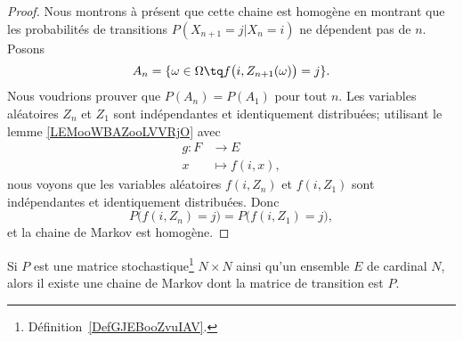 \begin{proof}
    Nous montrons à présent que cette chaine est homogène en montrant que les probabilités de transitions \( P(X_{n+1}=j|X_n=i)\) ne dépendent pas de \( n\). Posons
    \begin{equation}
        A_n=\{ \omega\in \Omega\tq f\big( i,Z_{n+1}(\omega) \big)=j \}.
    \end{equation}
    Nous voudrions prouver que \( P(A_n)=P(A_{1})\) pour tout \( n\). Les variables aléatoires \( Z_n\) et \( Z_1\) sont indépendantes et identiquement distribuées; utilisant le lemme \ref{LEMooWBAZooLVVRjO} avec 
    \begin{equation}
        \begin{aligned}
            g\colon F&\to E \\
            x&\mapsto f(i,x), 
        \end{aligned}
    \end{equation}
    nous voyons que les variables aléatoires \( f(i,Z_n)\) et \( f(i, Z_1)\) sont indépendantes et identiquement distribuées. Donc
    \begin{equation}
        P\big( f(i,Z_n)=j \big)=P\big( f(i,Z_1)=j \big),
    \end{equation}
    et la chaine de Markov est homogène.
\end{proof}

\begin{lemma}       \label{LEMooQBOIooMNbJlV}
    Si \( P\) est une matrice stochastique\footnote{Définition~\ref{DefGJEBooZvuIAV}.} \( N\times N\) ainsi qu'un ensemble \( E\) de cardinal \( N\), alors il existe une chaine de Markov dont la matrice de transition est \( P\).
\end{lemma}

